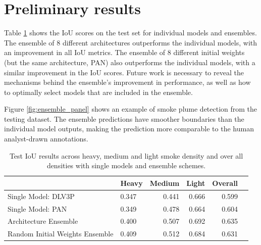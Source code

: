 \documentclass{article}
\begin{document}
\section{Preliminary results}
Table \ref{tab:results} shows the IoU scores on the test set for individual models and ensembles. The ensemble of 8 different architectures outperforms the individual models, with an improvement in all IoU metrics. The ensemble of 8 different initial weights (but the same architecture, PAN) also outperforms the individual models, with a similar improvement in the IoU scores. Future work is necessary to reveal the mechanisms behind the ensemble's improvement in performance, as well as how to optimally select models that are included in the ensemble.

Figure \ref{fig:ensemble_panel} shows an example of smoke plume detection from the testing dataset. The ensemble predictions have smoother boundaries than the individual model outputs, making the prediction more comparable to the human analyst-drawn annotations.
\begin{table}[h]
    \centering
    \caption{Test IoU results across heavy, medium and light smoke density and over all densities with single models and ensemble schemes.}
    \label{tab:results}
    \begin{tabular}{llrrr>{\bfseries}r}
        \hline
            &   Heavy &   Medium &   Light &   Overall \\
        \hline
        Single Model: DLV3P \citep{dlv3p} &   0.347 &     0.441 &  0.666 &      0.599  \\
        Single Model: PAN \citep{PAN} &  0.349 &     0.478 &  0.664 &      0.604 \\
        Architecture Ensemble &   0.400 &     0.507 &  0.692 &      0.635 \\ %
        Random Initial Weights Ensemble &  0.409 &     0.512 &  0.684 &      0.631 \\%
         \hline
    \end{tabular}
    \end{table}
\end{document}
